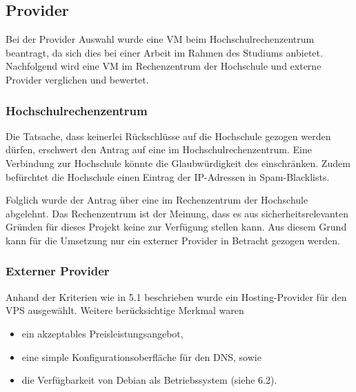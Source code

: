 \documentclass[a4paper,11pt,singlespacing]{article}
\begin{document}
	\subsection{Provider}\label{sec:AuswahlLösungProvider}
		Bei der Provider Auswahl wurde eine VM beim Hochschulrechenzentrum beantragt, da sich dies bei einer Arbeit im Rahmen des Studiums anbietet.
		Nachfolgend wird eine VM im Rechenzentrum der Hochschule und externe Provider verglichen und bewertet.
		
		\subsubsection{Hochschulrechenzentrum}\label{sec:AuswahlLösungDMZHochschulrechenzentrum}
			Die Tatsache, dass keinerlei Rückschlüsse auf die Hochschule gezogen werden dürfen, erschwert den Antrag auf eine  im Hochschulrechenzentrum.
			Eine Verbindung zur Hochschule könnte die Glaubwürdigkeit des  einschränken.
			Zudem befürchtet die Hochschule einen Eintrag der IP-Adressen in Spam-Blacklists.

			Folglich wurde der Antrag über eine  im Rechenzentrum der Hochschule abgelehnt.
			Das Rechenzentrum ist der Meinung, dass es aus sicherheitsrelevanten Gründen für dieses Projekt keine  zur Verfügung stellen kann.
			Aus diesem Grund kann für die Umsetzung nur ein externer Provider in Betracht gezogen werden.

		\subsubsection{Externer Provider}\label{sec:AuswahlLösungExterneProvider}
			Anhand der Kriterien wie in 5.1 beschrieben wurde ein Hosting-Provider für den VPS ausgewählt.
			Weitere berücksichtige Merkmal waren
			\begin{itemize}
				\item ein akzeptables Preisleistungsangebot,
				\item eine simple Konfigurationsoberfläche für den DNS, sowie
				\item die Verfügbarkeit von Debian als Betriebssystem (siehe 6.2).
			\end{itemize}		
\end{document}
